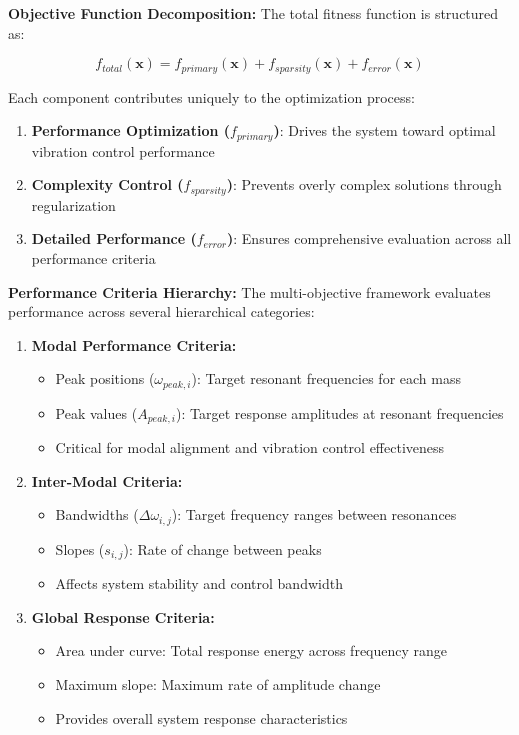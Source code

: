 \documentclass[12pt,a4paper]{article}
\begin{document}
\textbf{Objective Function Decomposition:} The total fitness function is structured as:

\begin{equation}\label{Eq.multi_objective_decomposition_detailed}
f_{total}(\mathbf{x}) = f_{primary}(\mathbf{x}) + f_{sparsity}(\mathbf{x}) + f_{error}(\mathbf{x})
\end{equation}

Each component contributes uniquely to the optimization process:

\begin{enumerate}
    \item \textbf{Performance Optimization ($f_{primary}$)}: Drives the system toward optimal vibration control performance
    \item \textbf{Complexity Control ($f_{sparsity}$)}: Prevents overly complex solutions through regularization
    \item \textbf{Detailed Performance ($f_{error}$)}: Ensures comprehensive evaluation across all performance criteria
\end{enumerate}

\textbf{Performance Criteria Hierarchy:} The multi-objective framework evaluates performance across several hierarchical categories:

\begin{enumerate}
    \item \textbf{Modal Performance Criteria:}
    \begin{itemize}
        \item Peak positions ($\omega_{peak,i}$): Target resonant frequencies for each mass
        \item Peak values ($A_{peak,i}$): Target response amplitudes at resonant frequencies
        \item Critical for modal alignment and vibration control effectiveness
    \end{itemize}

    \item \textbf{Inter-Modal Criteria:}
    \begin{itemize}
        \item Bandwidths ($\Delta\omega_{i,j}$): Target frequency ranges between resonances
        \item Slopes ($s_{i,j}$): Rate of change between peaks
        \item Affects system stability and control bandwidth
    \end{itemize}

    \item \textbf{Global Response Criteria:}
    \begin{itemize}
        \item Area under curve: Total response energy across frequency range
        \item Maximum slope: Maximum rate of amplitude change
        \item Provides overall system response characteristics
    \end{itemize}
\end{enumerate}
\end{document}
